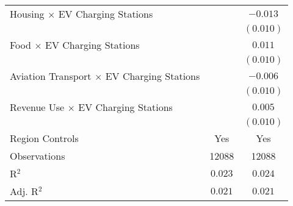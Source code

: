\begin{center}
\begin{tiny}
\begin{longtable}{l@{} c@{} c@{}}
\quad Housing $\times$ EV Charging Stations            &                 & $-0.013$       \\
                                                       &                 & $(0.010)$      \\
\quad Food $\times$ EV Charging Stations               &                 & $0.011$        \\
                                                       &                 & $(0.010)$      \\
\quad Aviation Transport $\times$ EV Charging Stations &                 & $-0.006$       \\
                                                       &                 & $(0.010)$      \\
\quad Revenue Use $\times$ EV Charging Stations        &                 & $0.005$        \\
                                                       &                 & $(0.010)$      \\
\hline
Region Controls                                        & Yes             & Yes            \\
Observations                                           & 12088           & 12088          \\
R$^2$                                                  & $0.023$         & $0.024$        \\
Adj. R$^2$                                             & $0.021$         & $0.021$        \\
\end{longtable}
\end{tiny}
\end{center}
